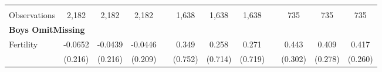 \begin{landscape}
\begin{table}[htpb!]
\begin{center}
\begin{tabular}{lcccp{2mm}cccp{2mm}ccc}
\begin{footnotesize}\end{footnotesize}&\begin{footnotesize}\end{footnotesize}&\begin{footnotesize}\end{footnotesize}&\begin{footnotesize}\end{footnotesize}&\begin{footnotesize}\end{footnotesize}&\begin{footnotesize}\end{footnotesize}&\begin{footnotesize}\end{footnotesize}&\begin{footnotesize}\end{footnotesize}&\begin{footnotesize}\end{footnotesize}&\begin{footnotesize}\end{footnotesize}&\begin{footnotesize}\end{footnotesize}&\begin{footnotesize}\end{footnotesize}\\Observations&2,182&2,182&2,182&&1,638&1,638&1,638&&735&735&735\\
\multicolumn{12}{l}{\textbf{Boys OmitMissing}}\\ 
Fertility&-0.0652&-0.0439&-0.0446&&0.349&0.258&0.271&&0.443&0.409&0.417\\
&(0.216)&(0.216)&(0.209)&&(0.752)&(0.714)&(0.719)&&(0.302)&(0.278)&(0.260)\\

\end{tabular}
\end{center}
\end{table}
\end{landscape}
